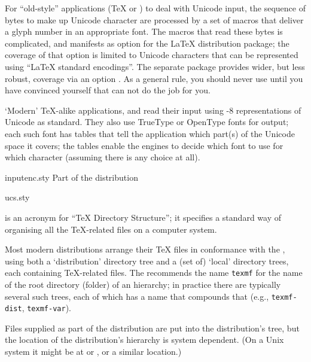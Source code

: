 For ``old-style'' applications (\TeX{} or \pdftex{}) to deal with
Unicode input, the sequence of bytes to make up Unicode character are
processed by a set of macros that deliver a glyph number in an
appropriate font.  The macros that read these bytes is complicated,
and manifests as  option for the \LaTeX{} distribution
 package; the coverage of that option is limited to
Unicode characters that can be represented using ``\LaTeX{} standard
encodings''.  The separate package  provides wider, but
less robust, coverage via an  option
.  As a general rule, you should never use
 until you have convinced yourself that
 can not do the job for you.

`Modern' \TeX{}-alike applications,  and
 read their input using -8
representations of Unicode as standard.  They also use TrueType or
OpenType fonts for output; each such font has tables that tell the
application which part(s) of the Unicode space it covers; the tables
enable the engines to decide which font to use for which character
(assuming there is any choice at all).
\begin{ctanrefs}
\item[inputenc.sty]Part of the  distribution
\item[ucs.sty]
\end{ctanrefs}


 is an acronym for ``\TeX{} Directory Structure''; it
specifies a standard way of organising all the \TeX{}-related files on
a computer system.

Most modern distributions arrange their \TeX{} files in conformance
with the , using both a `distribution' directory tree and a
(set of) `local' directory trees, each containing \TeX{}-related
files.  The  recommends the name \texttt{texmf} for the name
of the root directory (folder) of an hierarchy; in practice there are
typically several such trees, each of which has a name that compounds
that (e.g., \texttt{texmf-dist}, \texttt{texmf-var}).

Files supplied as part of the distribution are put into the
distribution's tree, but the location of the distribution's hierarchy is
system dependent.  (On a Unix system it might be at
 or , or a similar location.)

